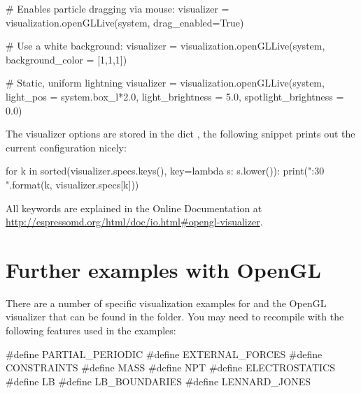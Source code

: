 \documentclass[
paper=a4,                       %
fontsize=11pt,                  %
twoside,                        %
footsepline,                    %
headsepline,                    %
headinclude=false,              %
footinclude=false,              %
pagesize,                       %
]{scrartcl}
\begin{document}
\begin{pypresso} 
# Enables particle dragging via mouse:
visualizer = visualization.openGLLive(system, drag_enabled=True)
\end{pypresso}

\begin{pypresso} 
# Use a white background:
visualizer = visualization.openGLLive(system, background_color = [1,1,1])
\end{pypresso}

\begin{pypresso} 
# Static, uniform lightning
visualizer = visualization.openGLLive(system, light_pos = system.box_l*2.0, light_brightness = 5.0, spotlight_brightness = 0.0)
\end{pypresso}

The visualizer options are stored in the dict ,
the following snippet prints out the current configuration nicely: 

\begin{pypresso} 
for k in sorted(visualizer.specs.keys(), key=lambda s: s.lower()): print("{:30}  {}".format(k, visualizer.specs[k]))
\end{pypresso}

All keywords are explained in the Online Documentation at
\url{http://espressomd.org/html/doc/io.html#opengl-visualizer}.  

\section{Further examples with OpenGL}

There are a number of specific visualization examples for \es and the OpenGL visualizer that can be found
in the  folder. You may need to recompile \es with the following features used in the examples:

\begin{pypresso}
#define PARTIAL_PERIODIC
#define EXTERNAL_FORCES
#define CONSTRAINTS
#define MASS
#define NPT
#define ELECTROSTATICS
#define LB
#define LB_BOUNDARIES
#define LENNARD_JONES
\end{pypresso}
\end{document}
